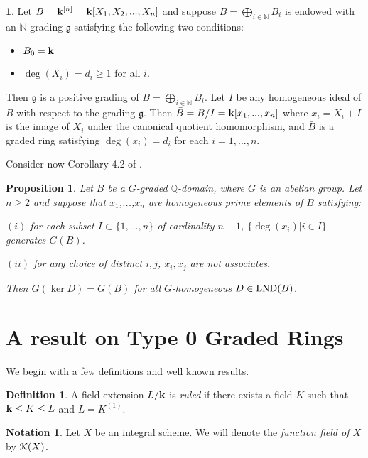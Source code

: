 \documentclass[12pt]{amsart}
\theoremstyle{plain}
\newtheorem{proposition}[subsection]{Proposition}
\theoremstyle{definition}
\newtheorem{definition}[subsection]{Definition}
\newtheorem{nothing}[subsection]{}
\newtheorem{notation}[subsection]{Notation}
\newcommand{\Nat}{\ensuremath{\mathbb{N}}}
\newcommand{\Rat}{\ensuremath{\mathbb{Q}}}
\newcommand{\bk}{{\ensuremath{\rm \bf k}}}
\newcommand{\Keul}{\EuScript{K}}
\newcommand{\ggoth}{\mathfrak{g}}
\newcommand{\lnd}{\operatorname{{\rm LND}}}
\begin{document}
\begin{nothing} Let $B = \bk^{[n]} = \bk[X_1,X_2, ..., X_n]$ and suppose $B = \bigoplus\limits_{i \in \Nat} B_i$ is endowed with an $\Nat$-grading $\ggoth$ satisfying the following two conditions: 
\begin{itemize}
	\item $B_0 = \bk$
	\item $\deg(X_i) = d_i \geq 1$ for all $i$.
\end{itemize}

Then $\ggoth$ is a positive grading of $B = \bigoplus_{i \in \Nat} B_i$. Let $I$ be any homogeneous ideal of $B$ with respect to the grading $\ggoth$. Then $\bar{B} = B/I = \bk[x_1, ..., x_n]$ where $x_i = X_i + I$ is the image of $X_i$ under the canonical quotient homomorphism, and $\bar{B}$ is a graded ring satisfying $\deg(x_i) = d_i$ for each $i = 1, ..., n$. 
\end{nothing}

Consider now Corollary 4.2 of \cite{daigle:hal-01691491}. 

\begin{proposition} Let $B$ be a $G$-graded $\Rat$-domain, where $G$ is an abelian group. Let $n \geq 2$ and suppose that $x_1$,...,$x_n$ are homogeneous prime elements of $B$ satisfying:

$(i)$ for each subset $I \subset \{1,...,n\}$ of cardinality $n - 1$,
$\{ \deg(x_i) | i \in I\}$ generates $G(B)$.  

$(ii)$ for any choice of distinct $i,j$, $x_i, x_j$ are not associates.

Then $G(\ker D) = G(B)$ for all $G$-homogeneous $D  \in \lnd(B)$.

\end{proposition}

\section{A result on Type 0 Graded Rings}

We begin with a few definitions and well known results. 

\begin{definition}
	A field extension $L / \bk$ is \textit{ruled} if there exists a field $K$ such that $\bk \leq K \leq L$ and $L = K^{(1)}$.  
\end{definition}

\begin{notation} Let $X$ be an integral scheme. We will denote the \textit{function field of $X$} by $\Keul(X)$.
\end{notation}
\end{document}
